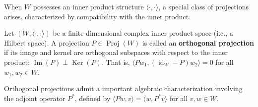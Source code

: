 When $W$ possesses an inner product structure $\langle \cdot, \cdot \rangle$, a special class of projections arises, characterized by compatibility with the inner product.

\begin{definition}
\label{def:orthogonal_projection}
Let $(W, \langle \cdot, \cdot \rangle)$ be a finite-dimensional complex inner product space (i.e., a Hilbert space). A projection $P \in \operatorname{Proj}(W)$ is called an \textbf{orthogonal projection} if its image and kernel are orthogonal subspaces with respect to the inner product: $\operatorname{Im}(P) \perp \operatorname{Ker}(P)$. That is, $\langle Pw_1, (\operatorname{id}_W-P)w_2 \rangle = 0$ for all $w_1, w_2 \in W$.
\end{definition}

Orthogonal projections admit a important algebraic characterization involving the adjoint operator $P^*$, defined by $\langle Pw, v \rangle = \langle w, P^*v \rangle$ for all $v, w \in W$.

